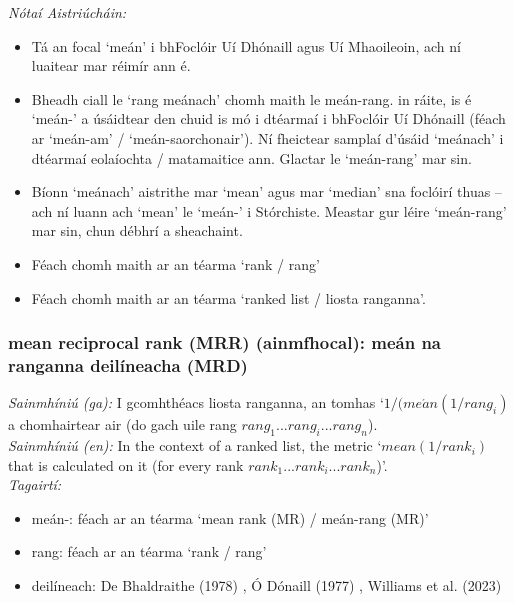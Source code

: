  \noindent \textit{Nótaí Aistriúcháin:}
\begin{itemize}
	\item Tá an focal `meán' i bhFoclóir Uí Dhónaill agus Uí Mhaoileoin, ach ní luaitear mar réimír ann é.
	\item Bheadh ciall le `rang meánach' chomh maith le meán-rang. in ráite, is é `meán-' a úsáidtear den chuid is mó i dtéarmaí i bhFoclóir Uí Dhónaill (féach ar `meán-am' / `meán-saorchonair'). Ní fheictear samplaí d'úsáid `meánach' i dtéarmaí eolaíochta / matamaitice ann. Glactar le `meán-rang' mar sin.
	\item Bíonn `meánach' aistrithe mar `mean' agus mar `median' sna foclóirí thuas -- ach ní luann ach `mean' le `meán-' i Stórchiste. Meastar gur léire `meán-rang' mar sin, chun débhrí a sheachaint.
	\item Féach chomh maith ar an téarma `rank / rang'
	\item Féach chomh maith ar an téarma `ranked list / liosta ranganna'.
\end{itemize}


\subsubsection*{mean reciprocal rank (MRR) (ainmfhocal): meán na ranganna deilíneacha (MRD)}
 \noindent \textit{Sainmhíniú (ga):} I gcomhthéacs liosta ranganna, an tomhas `$1 / (me\acute{a}n(1 / rang_i)$ a chomhairtear air (do gach uile rang $rang_1...rang_i...rang_n$).
\\
 \noindent \textit{Sainmhíniú (en):} In the context of a ranked list, the metric `$mean(1 / rank_i)$ that is calculated on it (for every rank $rank_1...rank_i...rank_n$)'.
\\
 \noindent \textit{Tagairtí:}
\begin{itemize}
	\item meán-: féach ar an téarma `mean rank (MR) / meán-rang (MR)'
	\item rang: féach ar an téarma `rank / rang'
	\item deilíneach: De Bhaldraithe (1978) \cite{de-bhaldraithe}, Ó Dónaill (1977) \cite{odonaill}, Williams et al. (2023) \cite{storchiste}
\end{itemize}

